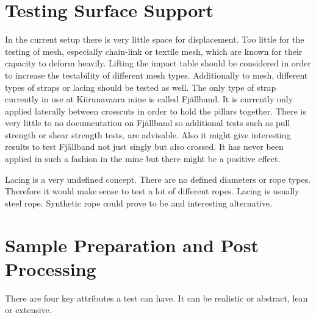 \section{Testing Surface Support}
\label{sec:mesh}

In the current setup there is very little space for displacement. Too little for the testing of mesh, especially chain-link or textile mesh, which are known for their capacity to deform heavily. Lifting the impact table should be considered in order to increase the testability of different mesh types. Additionally to mesh, different types of straps or lacing should be tested as well. The only type of strap currently in use at Kiirunavaara mine is called %
 Fjällband. It is currently only applied laterally between crosscuts in order to  hold the pillars together. %
 There is very little to no documentation on Fjällband so additional tests such as pull strength or shear strength tests, are advisable. Also it might give interesting results to test Fjällband not just singly but also crossed. It has never been applied in such a fashion in the mine but there might be a positive effect.

Lacing is a very undefined concept. There are no defined diameters or rope types. Therefore it would make sense to test a lot of different ropes. Lacing is usually steel rope. Synthetic rope could prove to be and interesting alternative.

\section{Sample Preparation and Post Processing}


There are four key attributes a test can have.
It can be realistic or abstract, lean or extensive.

